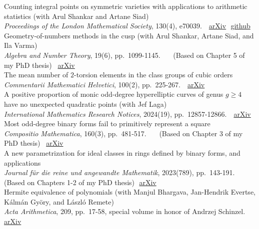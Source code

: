 \documentclass[11pt]{article} %
\begin{document}
 {Counting integral points on symmetric varieties with applications to arithmetic statistics} (with Arul Shankar and Artane Siad)\\
\emph{Proceedings of the London Mathematical Society}, 130(4), e70039.
\,\, \textcolor[rgb]{0,0,1}{\href{https://arxiv.org/pdf/2304.01050.pdf}{arXiv}}\,\, \textcolor[rgb]{0,0,1}{\href{https://github.com/ashvin-swaminathan/special-cubics}{github}} \\
 {Geometry-of-numbers methods in the cusp} (with Arul Shankar, Artane Siad, and Ila Varma)\\
\emph{Algebra and Number Theory}, 19(6), pp.~1099-1145.~~~ (Based on Chapter 5 of my PhD thesis)\,\,\, \textcolor[rgb]{0,0,1}{\href{https://arxiv.org/pdf/2110.09466.pdf}{arXiv}} \\
 {The mean number of $2$-torsion elements in the class groups of cubic orders} \\
\emph{Commentarii Mathematici Helvetici}, 100(2), pp.~225-267.
\,\, \textcolor[rgb]{0,0,1}{\href{https://arxiv.org/pdf/2211.08729.pdf}{arXiv}} \\
 {A positive proportion of monic odd-degree hyperelliptic curves of genus $g \geq 4$ have no unexpected quadratic points} (with Jef Laga)
\\ \emph{International Mathematics Research Notices}, 2024(19), pp.~12857-12866.
\,\, \textcolor[rgb]{0,0,1}{\href{https://arxiv.org/pdf/2405.09421}{arXiv}} \\
 {Most odd-degree binary forms fail to primitively represent a square} \\ \emph{Compositio Mathematica}, 160(3), pp.~481-517.~~~ (Based on Chapter 3 of my PhD thesis)\,\,\, \textcolor[rgb]{0,0,1}{\href{https://arxiv.org/pdf/1910.12409}{arXiv}}\\
 {A new parametrization for ideal classes in rings defined by binary forms, and applications} \\ \emph{Journal f\"{u}r die reine und angewandte Mathematik}, 2023(789), pp.~143-191.\,\, (Based on Chapters 1-2 of my PhD thesis)\,\, \textcolor[rgb]{0,0,1}{\href{https://arxiv.org/pdf/2011.13578}{arXiv}}\\
 {Hermite equivalence of polynomials} (with Manjul Bhargava, Jan-Hendrik Evertse, K\'{a}lm\'{a}n Gy\"{o}ry, and L\'{a}szl\'{o} Remete) \\
\emph{Acta Arithmetica}, 209, pp.~17-58, special volume in honor of Andrzej Schinzel.\,\, \textcolor[rgb]{0,0,1}{\href{https://arxiv.org/pdf/2109.02932.pdf}{arXiv}} \\
\end{document}
